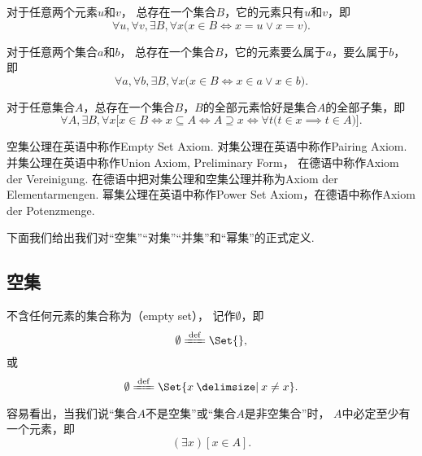 \begin{axiom}[对集公理]\label{axiom:集合论.对集公理}
对于任意两个元素\(u\)和\(v\)，
总存在一个集合\(B\)，它的元素只有\(u\)和\(v\)，即\[
	\forall u, \forall v, \exists B, \forall x
	\bigl(
		x \in B \iff x = u \lor x = v
	\bigr).
\]
\end{axiom}

\begin{axiom}[并集公理I]
对于任意两个集合\(a\)和\(b\)，
总存在一个集合\(B\)，它的元素要么属于\(a\)，要么属于\(b\)，即\[
	\forall a, \forall b, \exists B, \forall x
	\bigl(
		x \in B
		\iff
		x \in a \lor x \in b
	\bigr).
\]
\end{axiom}

\begin{axiom}[幂集公理]
	对于任意集合\(A\)，总存在一个集合\(B\)，\(B\)的全部元素恰好是集合\(A\)的全部子集，即\[
	\forall A, \exists B, \forall x \bigl[
		x \in B
		\iff
		x \subseteq A
		\iff
		A \supseteq x
		\iff
		\forall t \bigl( t \in x \implies t \in A \bigr)
	\bigr].
\]
\end{axiom}


空集公理在英语中称作Empty Set Axiom.
对集公理在英语中称作Pairing Axiom.
并集公理在英语中称作Union Axiom, Preliminary Form，
在德语中称作Axiom der Vereinigung.
在德语中把对集公理和空集公理并称为Axiom der Elementarmengen.
幂集公理在英语中称作Power Set Axiom，在德语中称作Axiom der Potenzmenge.

下面我们给出我们对“空集”“对集”“并集”和“幂集”的正式定义.

\subsection{空集}
\begin{definition}
不含任何元素的集合称为（empty set），
记作\(\emptyset\)，即
\begin{equation}
	\emptyset \defeq \Set{},
\end{equation}
或
\begin{equation}
	\emptyset \defeq \Set{ x \given x \neq x }.
\end{equation}
\end{definition}

容易看出，当我们说“集合\(A\)不是空集”或“集合\(A\)是非空集合”时，
\(A\)中必定至少有一个元素，即\[
	(\exists x)[x \in A].
\]

